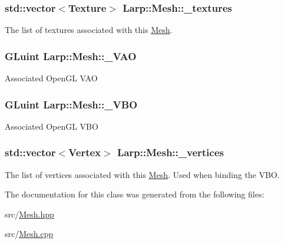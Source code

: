 \subsubsection[{\texorpdfstring{\+\_\+textures}{_textures}}]{\setlength{\rightskip}{0pt plus 5cm}std\+::vector$<${\bf Texture}$>$ Larp\+::\+Mesh\+::\+\_\+textures}\hypertarget{classLarp_1_1Mesh_a54c9edf45e99fb0261a39bfc3e8ff091}{}\label{classLarp_1_1Mesh_a54c9edf45e99fb0261a39bfc3e8ff091}
The list of textures associated with this \hyperlink{classLarp_1_1Mesh}{Mesh}. 
\subsubsection[{\texorpdfstring{\+\_\+\+V\+AO}{_VAO}}]{\setlength{\rightskip}{0pt plus 5cm}G\+Luint Larp\+::\+Mesh\+::\+\_\+\+V\+AO\hspace{0.3cm}{\ttfamily [private]}}\hypertarget{classLarp_1_1Mesh_acba7ec21576ff64c769df9d374ed1cc5}{}\label{classLarp_1_1Mesh_acba7ec21576ff64c769df9d374ed1cc5}
Associated Open\+GL V\+AO 
\subsubsection[{\texorpdfstring{\+\_\+\+V\+BO}{_VBO}}]{\setlength{\rightskip}{0pt plus 5cm}G\+Luint Larp\+::\+Mesh\+::\+\_\+\+V\+BO\hspace{0.3cm}{\ttfamily [private]}}\hypertarget{classLarp_1_1Mesh_a72ad2a0ac19c617fc9abc4f48fd99350}{}\label{classLarp_1_1Mesh_a72ad2a0ac19c617fc9abc4f48fd99350}
Associated Open\+GL V\+BO 
\subsubsection[{\texorpdfstring{\+\_\+vertices}{_vertices}}]{\setlength{\rightskip}{0pt plus 5cm}std\+::vector$<${\bf Vertex}$>$ Larp\+::\+Mesh\+::\+\_\+vertices}\hypertarget{classLarp_1_1Mesh_af77086ebadfb8b0f4fb3c2e5f39d6a43}{}\label{classLarp_1_1Mesh_af77086ebadfb8b0f4fb3c2e5f39d6a43}
The list of vertices associated with this \hyperlink{classLarp_1_1Mesh}{Mesh}. Used when binding the V\+BO. 

The documentation for this class was generated from the following files\+:\begin{DoxyCompactItemize}
\item 
src/\hyperlink{Mesh_8hpp}{Mesh.\+hpp}\item 
src/\hyperlink{Mesh_8cpp}{Mesh.\+cpp}\end{DoxyCompactItemize}
